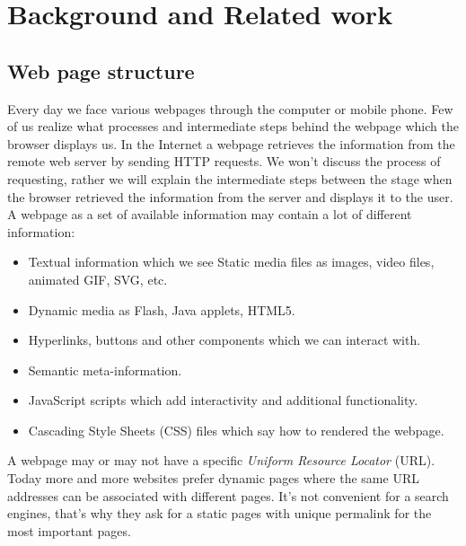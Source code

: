 \chapter{Background and Related work}
\label{chap:background}

\section{Web page structure}
Every day we face various webpages through the computer or mobile phone. Few of us realize what processes and intermediate steps behind the webpage which the browser displays us. In the Internet a webpage retrieves the information from the remote web server by sending HTTP requests. We won't discuss the process of requesting, rather we will explain the intermediate steps between the stage when the browser retrieved the information from the server and displays it to the user. \\

A webpage as a set of available information may contain a lot of different information:

\begin{itemize}
    \item Textual information which we see
    \itme Static media files as images, video files, animated GIF, SVG, etc.
    \item Dynamic media as Flash, Java applets, HTML5.
    \item Hyperlinks, buttons and other components which we can interact with.
    \item Semantic meta-information.
    \item JavaScript scripts which add interactivity and additional functionality.
    \item Cascading Style Sheets (CSS) files which say how to rendered the webpage.
\end{itemize}

A webpage may or may not have a specific \textit{Uniform Resource Locator} (URL). Today more and more websites prefer dynamic pages where the same URL addresses can be associated with different pages. It's not convenient for a search engines, that's why they ask for a static pages with unique permalink for the most important pages. \\

